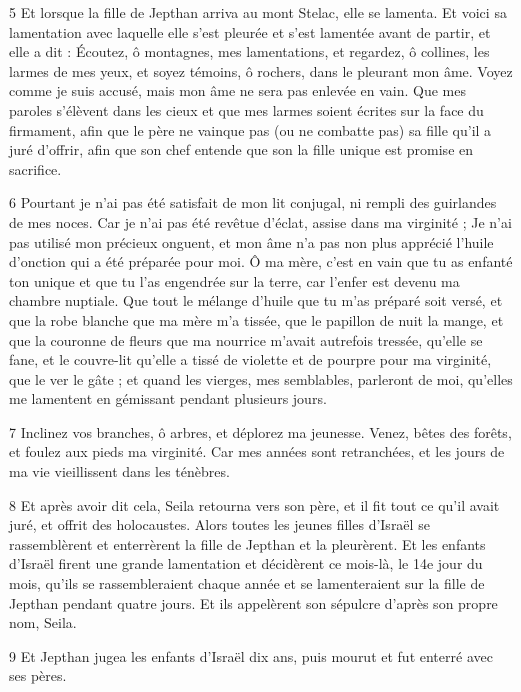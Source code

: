 \par 5 Et lorsque la fille de Jepthan arriva au mont Stelac, elle se lamenta. Et voici sa lamentation avec laquelle elle s'est pleurée et s'est lamentée avant de partir, et elle a dit : Écoutez, ô montagnes, mes lamentations, et regardez, ô collines, les larmes de mes yeux, et soyez témoins, ô rochers, dans le pleurant mon âme. Voyez comme je suis accusé, mais mon âme ne sera pas enlevée en vain. Que mes paroles s'élèvent dans les cieux et que mes larmes soient écrites sur la face du firmament, afin que le père ne vainque pas (ou ne combatte pas) sa fille qu'il a juré d'offrir, afin que son chef entende que son la fille unique est promise en sacrifice.

\par 6 Pourtant je n'ai pas été satisfait de mon lit conjugal, ni rempli des guirlandes de mes noces. Car je n'ai pas été revêtue d'éclat, assise dans ma virginité ; Je n'ai pas utilisé mon précieux onguent, et mon âme n'a pas non plus apprécié l'huile d'onction qui a été préparée pour moi. Ô ma mère, c'est en vain que tu as enfanté ton unique et que tu l'as engendrée sur la terre, car l'enfer est devenu ma chambre nuptiale. Que tout le mélange d'huile que tu m'as préparé soit versé, et que la robe blanche que ma mère m'a tissée, que le papillon de nuit la mange, et que la couronne de fleurs que ma nourrice m'avait autrefois tressée, qu'elle se fane, et le couvre-lit qu'elle a tissé de violette et de pourpre pour ma virginité, que le ver le gâte ; et quand les vierges, mes semblables, parleront de moi, qu'elles me lamentent en gémissant pendant plusieurs jours.

\par 7 Inclinez vos branches, ô arbres, et déplorez ma jeunesse. Venez, bêtes des forêts, et foulez aux pieds ma virginité. Car mes années sont retranchées, et les jours de ma vie vieillissent dans les ténèbres.

\par 8 Et après avoir dit cela, Seila retourna vers son père, et il fit tout ce qu'il avait juré, et offrit des holocaustes. Alors toutes les jeunes filles d'Israël se rassemblèrent et enterrèrent la fille de Jepthan et la pleurèrent. Et les enfants d'Israël firent une grande lamentation et décidèrent ce mois-là, le 14e jour du mois, qu'ils se rassembleraient chaque année et se lamenteraient sur la fille de Jepthan pendant quatre jours. Et ils appelèrent son sépulcre d'après son propre nom, Seila.

\par 9 Et Jepthan jugea les enfants d'Israël dix ans, puis mourut et fut enterré avec ses pères.

